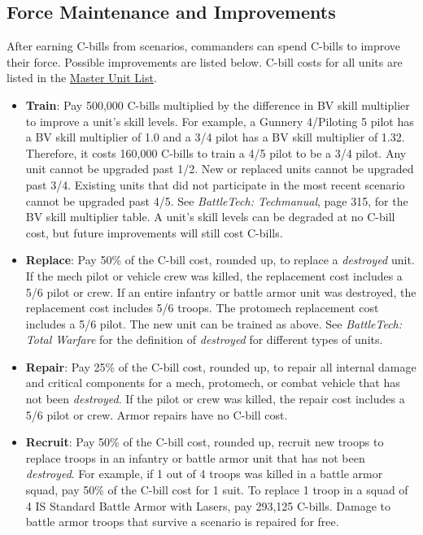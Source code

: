 \documentclass[UTF8]{article}
\begin{document}
\subsection{Force Maintenance and Improvements}

After earning C-bills from scenarios, commanders can spend C-bills to improve their force.
Possible improvements are listed below.
C-bill costs for all units are listed in the \href{http://www.masterunitlist.info}{Master Unit List}.\\

\begin{itemize}

\item {\bf Train}: Pay 500,000 C-bills multiplied by the difference in BV skill multiplier to improve a unit's skill levels.
For example, a Gunnery 4/Piloting 5 pilot has a BV skill multiplier of 1.0 and a 3/4 pilot has a BV skill multiplier of 1.32.
Therefore, it costs 160,000 C-bills to train a 4/5 pilot to be a 3/4 pilot.
Any unit cannot be upgraded past 1/2.
New or replaced units cannot be upgraded past 3/4.
Existing units that did not participate in the most recent scenario cannot be upgraded past 4/5.
See \emph{BattleTech: Techmanual}, page 315, for the BV skill multiplier table.
A unit's skill levels can be degraded at no C-bill cost, but future improvements will still cost C-bills.

\item {\bf Replace}: Pay 50\% of the C-bill cost, rounded up, to replace a \emph{destroyed} unit.
If the mech pilot or vehicle crew was killed, the replacement cost includes a 5/6 pilot or crew.
If an entire infantry or battle armor unit was destroyed, the replacement cost includes 5/6 troops.
The protomech replacement cost includes a 5/6 pilot.
The new unit can be trained as above.
See \emph{BattleTech: Total Warfare} for the definition of \emph{destroyed} for different types of units.

\item {\bf Repair}: Pay 25\% of the C-bill cost, rounded up, to repair all internal damage and critical components for a mech, protomech, or combat vehicle that has not been \emph{destroyed}.
If the pilot or crew was killed, the repair cost includes a 5/6 pilot or crew.
Armor repairs have no C-bill cost.

\item {\bf Recruit}: Pay 50\% of the C-bill cost, rounded up, recruit new troops to replace troops in an infantry or battle armor unit that has not been \emph{destroyed}.
For example, if 1 out of 4 troops was killed in a battle armor squad, pay 50\% of the C-bill cost for 1 suit.
To replace 1 troop in a squad of 4 IS Standard Battle Armor with Lasers, pay 293,125 C-bills.
Damage to battle armor troops that survive a scenario is repaired for free.


\end{itemize}
\end{document}
